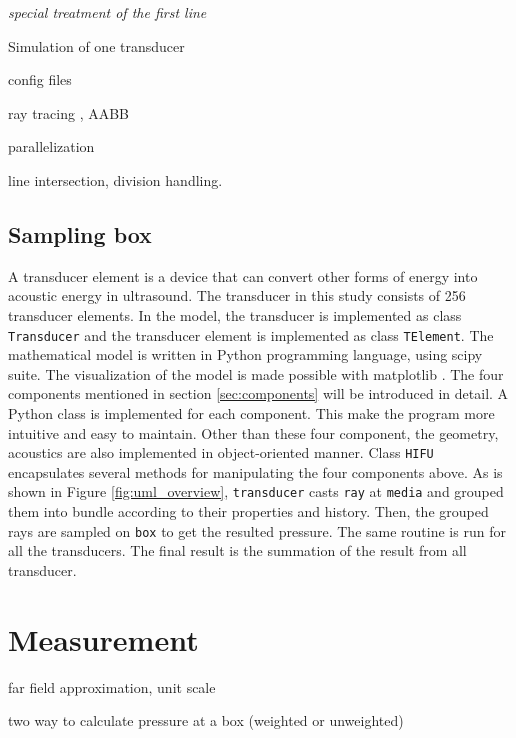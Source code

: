 \IncMargin{1em}
\begin{algorithm}[H]
    \BlankLine
    \emph{special treatment of the first line}\;
    \caption{Simulation of one transducer}\label{algo_disjdecomp}
\end{algorithm}
\DecMargin{1em}



config files

ray tracing \cite{wooraytracing}, AABB \cite{smits}

parallelization

line intersection, division handling.

\subsection{Sampling box}
A transducer element is a device that can convert other forms of energy into acoustic energy in ultrasound. The transducer in this study consists of 256 transducer elements. In the model, the transducer is implemented as class \texttt{Transducer} and the transducer element is implemented as class \texttt{TElement}.
The mathematical model is written in Python programming language, using scipy suite\cite{scipy}. The visualization of the model is made possible with matplotlib \cite{matplotlib}. The four components mentioned in section \ref{sec:components} will be introduced in detail. A Python class is implemented for each component. This make the program more intuitive and easy to maintain. Other than these four component, the geometry, acoustics are also implemented in object-oriented manner. Class \texttt{HIFU} encapsulates several methods for manipulating the four components above. As is shown in Figure \ref{fig:uml_overview}, \texttt{transducer} casts \texttt{ray} at \texttt{media} and grouped them into bundle according to their properties and history. Then, the grouped rays are sampled on \texttt{box} to get the resulted pressure. The same routine is run for all the transducers. The final result is the summation of the result from all transducer.

\section{Measurement} \label{sec:measurement}
far field approximation, unit scale \cite{unitscale}

two way to calculate pressure at a box (weighted or unweighted)
